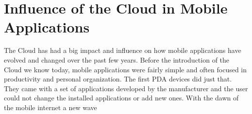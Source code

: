 \chapter{Influence of the Cloud in Mobile Applications}\label{ch:influence}

The Cloud has had a big impact and influence on how mobile applications have evolved and changed over the past few years. Before the introduction of the Cloud we know today, mobile applications were fairly simple and often focused in productivity and personal organization. The first \ac{PDA} devices did just that. They came with a set of applications developed by the manufacturer and the user could not change the installed applications or add new ones. With the dawn of the mobile internet a new wave 